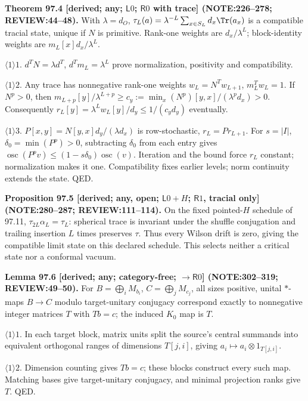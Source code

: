 \textbf{Theorem 97.4 [derived; any; \(\mathsf L0\); \(\mathsf R0\) with trace] (NOTE:226--278; REVIEW:44--48).}
With \(\lambda=d_O\), \(\tau_L(a)=\lambda^{-L}\sum_{x\in S_L}d_x\Tr(a_x)\) is a compatible tracial state,
unique if \(N\) is primitive. Rank-one weights are \(d_x/\lambda^L\); block-identity weights are \(m_L[x]d_x/\lambda^L\).
\par\(\langle1\rangle1\). \(d^TN=\lambda d^T\), \(d^Tm_L=\lambda^L\) prove normalization, positivity and compatibility.
\par\(\langle1\rangle2\). Any trace has nonnegative rank-one weights \(w_L=N^Tw_{L+1}\), \(m_L^Tw_L=1\).
If \(N^p>0\), then \(m_{L+p}[y]/\lambda^{L+p}\ge c_y:=\min_x(N^p)[y,x]/(\lambda^pd_x)>0\).
Consequently \(r_L[y]=\lambda^Lw_L[y]/d_y\le1/(c_yd_y)\) eventually.
\par\(\langle1\rangle3\). \(P[x,y]=N[y,x]d_y/(\lambda d_x)\) is row-stochastic, \(r_L=Pr_{L+1}\).
For \(s=|I|\), \(\delta_0=\min(P^p)>0\), subtracting \(\delta_0\) from each entry gives
\(\operatorname{osc}(P^pv)\le(1-s\delta_0)\operatorname{osc}(v)\). Iteration and the bound force \(r_L\) constant;
normalization makes it one. Compatibility fixes earlier levels; norm continuity extends the state. QED.

\textbf{Proposition 97.5 [derived; any, open; \(\mathsf L0+H\); \(\mathsf R1\), tracial only] (NOTE:280--287; REVIEW:111--114).}
On the fixed pointed-\(H\) schedule of 97.11, \(\tau_{2L}\alpha_L=\tau_L\): spherical trace is invariant under the
shuffle conjugation and trailing insertion \(L\) times preserves \(\tau\). Thus every Wilson drift is zero, giving
the compatible limit state on this declared schedule. This selects neither a critical state nor a conformal vacuum.

\textbf{Lemma 97.6 [derived; any; category-free; \(\to\mathsf R0\)] (NOTE:302--319; REVIEW:49--50).}
For \(B=\bigoplus_iM_{b_i}\), \(C=\bigoplus_jM_{c_j}\), all sizes positive, unital \(*\)-maps \(B\to C\) modulo target-unitary
conjugacy correspond exactly to nonnegative integer matrices \(T\) with \(Tb=c\); the induced \(K_0\) map is \(T\).
\par\(\langle1\rangle1\). In each target block, matrix units split the source's central summands into equivalent
orthogonal ranges of dimensions \(T[j,i]\), giving \(a_i\mapsto a_i\otimes1_{T[j,i]}\).
\par\(\langle1\rangle2\). Dimension counting gives \(Tb=c\); these blocks construct every such map. Matching bases
give target-unitary conjugacy, and minimal projection ranks give \(T\). QED.


